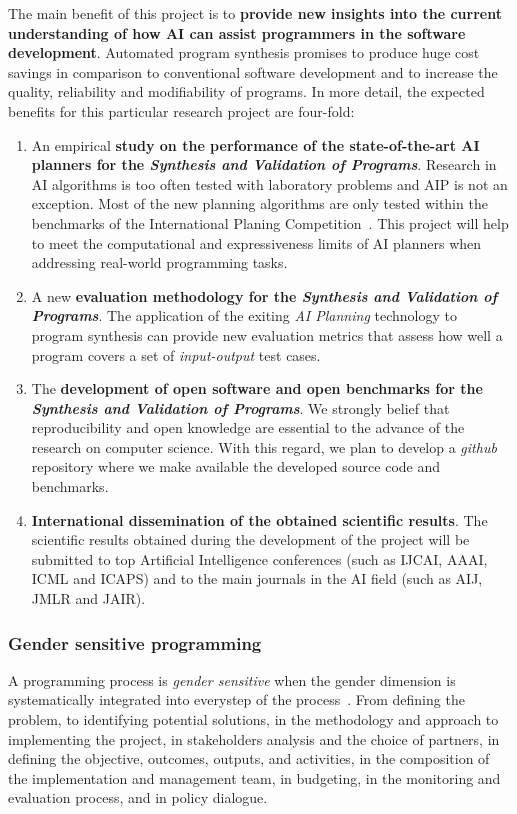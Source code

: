 \documentclass[10pt,a4paper]{paper}
\begin{document}
The main benefit of this project is to {\bf provide new insights into the current understanding of how AI can assist programmers in the software development}.  Automated program synthesis promises to produce huge cost savings in comparison to conventional software development and to increase the quality, reliability and modifiability of programs.  In more detail, the expected benefits for this particular research project are four-fold:
\begin{enumerate}
\item An empirical {\bf study on the performance of the state-of-the-art AI planners for the {\em Synthesis and Validation of Programs}}. Research in AI algorithms is too often tested with laboratory problems and AIP is not an exception. Most of the new planning algorithms are only tested within the benchmarks of the International Planing Competition~\cite{vallati:IPC:AI15}. This project will help to meet the computational and expressiveness limits of AI planners when addressing real-world programming tasks. 
\item A new {\bf evaluation methodology for the {\em Synthesis and Validation of Programs}}. The application of the exiting {\em AI Planning} technology to program synthesis can provide new evaluation metrics that assess how well a program covers a set of {\em input-output} test cases.  
\item The {\bf development of open software and open benchmarks for the {\em Synthesis and Validation of Programs}}. We strongly belief that reproducibility and open knowledge are essential to the advance of the research on computer science. With this regard, we plan to develop a {\em github} repository where we make available the developed source code and benchmarks.
\item {\bf International dissemination of the obtained scientific results}. The scientific results obtained during the development of the project will be submitted to top Artificial Intelligence conferences (such as IJCAI, AAAI, ICML and ICAPS) and to the main journals in the AI field (such as AIJ, JMLR and JAIR).
\end{enumerate}

\subsubsection{Gender sensitive programming}

A programming process is {\em gender sensitive} when the gender dimension is systematically integrated into everystep of the process~\cite{leduc2009guidelines}. From defining the problem, to identifying potential solutions, in the methodology and approach to implementing the project, in stakeholders analysis and the choice of partners, in defining the objective, outcomes, outputs, and activities, in the composition of the implementation and management team, in budgeting, in the monitoring and evaluation process, and in policy dialogue.
\end{document}
